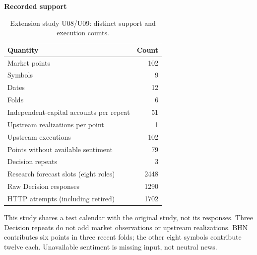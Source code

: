 \begin{table}[!htb]
\centering\small
\setlength{\tabcolsep}{3pt}
\renewcommand{\arraystretch}{1.12}
\caption{Extension study U08/U09: distinct support and execution counts.}
\label{tab:u09-scope}
\textbf{Recorded support}\par\smallskip
\begin{tabular}{lr}
\hline
Quantity & Count \\
\hline
Market points & 102 \\
Symbols & 9 \\
Dates & 12 \\
Folds & 6 \\
Independent-capital accounts per repeat & 51 \\
Upstream realizations per point & 1 \\
Upstream executions & 102 \\
Points without available sentiment & 79 \\
Decision repeats & 3 \\
Research forecast slots (eight roles) & 2448 \\
Raw Decision responses & 1290 \\
HTTP attempts (including retired) & 1702 \\
\hline
\end{tabular}\par\medskip
\begin{minipage}{\textwidth}\footnotesize This study shares a test calendar with the original study, not its responses. Three Decision repeats do not add market observations or upstream realizations. BHN contributes six points in three recent folds; the other eight symbols contribute twelve each. Unavailable sentiment is missing input, not neutral news.\end{minipage}
\end{table}
